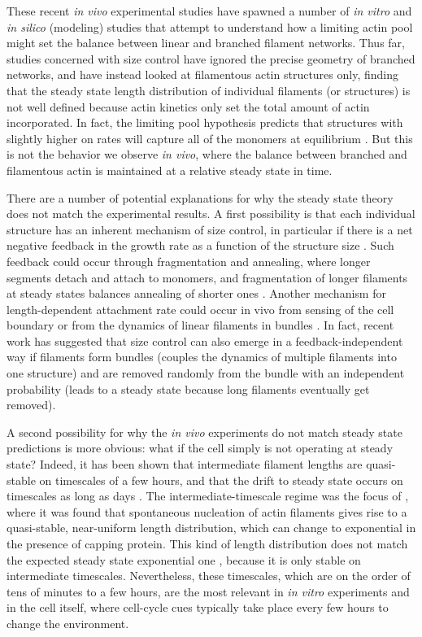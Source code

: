 \documentclass[11pt]{article}
\begin{document}
These recent \emph{in vivo} experimental studies have spawned a number of \emph{in vitro} and \emph{in silico} (modeling) studies that attempt to understand how a limiting actin pool might set the balance between linear and branched filament networks. Thus far, studies concerned with size control have ignored the precise geometry of branched networks, and have instead looked at filamentous actin structures only, finding that the steady state length distribution of individual filaments (or structures) is not well defined \cite{mohapatra2017limiting,harbage2016exact} because actin kinetics only set the total amount of actin incorporated. In fact, the limiting pool hypothesis predicts that structures with slightly higher on rates will capture all of the monomers at equilibrium \cite{mohapatra2017limiting}. But this is not the behavior we observe \emph{in vivo}, where the balance between branched and filamentous actin is maintained at a relative steady state in time. 

There are a number of potential explanations for why the steady state theory does not match the experimental results. A first possibility is that each individual structure has an inherent mechanism of size control, in particular if there is a net negative feedback in the growth rate as a function of the structure size  \cite{banerjee2022size}. Such feedback could occur through fragmentation and annealing, where longer segments detach and attach to monomers, and fragmentation of longer filaments at steady states balances annealing of shorter ones \cite{fass2008stochastic}. Another mechanism for length-dependent attachment rate could occur in vivo from sensing of the cell boundary \cite{mcinally2021scaling} or from the dynamics of linear filaments in bundles \cite{rosario2023universal}. In fact, recent work \cite{mcinally2023length} has suggested that size control can also emerge in a feedback-independent way if filaments form bundles (couples the dynamics of multiple filaments into one structure) and are removed randomly from the bundle with an independent probability (leads to a steady state because long filaments eventually get removed). 

A second possibility for why the \emph{in vivo} experiments do not match steady state predictions is more obvious: what if the cell simply is not operating at steady state? Indeed, it has been shown that intermediate filament lengths are quasi-stable on timescales of a few hours, and that the drift to steady state occurs on timescales as long as days \cite{hu2007theoretical,suarez2017enough}. The intermediate-timescale regime was the focus of \cite{banerjee2022emergence}, where it was found that spontaneous nucleation of actin filaments gives rise to a quasi-stable, near-uniform length distribution, which can change to exponential in the presence of capping protein. This kind of length distribution does not match the expected steady state exponential one \cite{edelstein1998models}, because it is only stable on intermediate timescales. Nevertheless, these timescales, which are on the order of tens of minutes to a few hours, are the most relevant in \emph{in vitro} experiments and in the cell itself, where cell-cycle cues typically take place every few hours to change the environment. 
\end{document}
